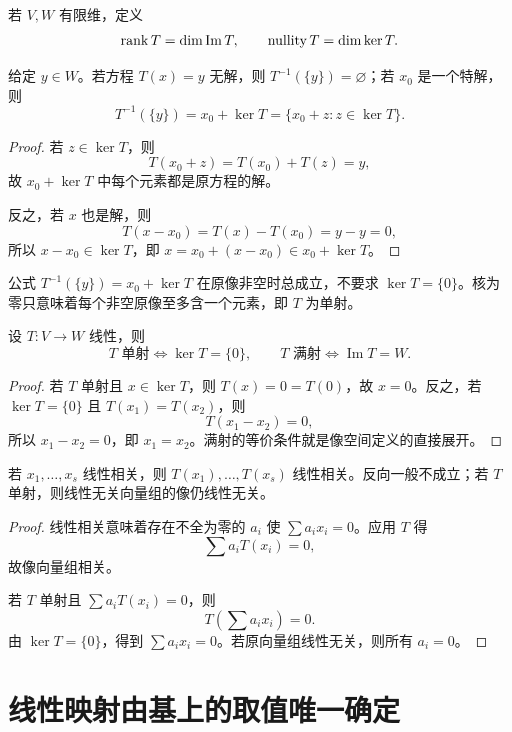 \begin{definition}[秩与零化度]
若 $V,W$ 有限维，定义
\[
\operatorname{rank} T=\dim\operatorname{Im}T,
\qquad
\operatorname{nullity}T=\dim\ker T.
\]
\end{definition}

\begin{theorem}[非空原像是核的仿射陪集]
给定 $y\in W$。若方程 $T(x)=y$ 无解，则 $T^{-1}(\{y\})=\varnothing$；若 $x_0$ 是一个特解，则
\[
T^{-1}(\{y\})=x_0+\ker T
=\{x_0+z:z\in\ker T\}.
\]
\end{theorem}
\begin{proof}
若 $z\in\ker T$，则
\[
T(x_0+z)=T(x_0)+T(z)=y,
\]
故 $x_0+\ker T$ 中每个元素都是原方程的解。

反之，若 $x$ 也是解，则
\[
T(x-x_0)=T(x)-T(x_0)=y-y=0,
\]
所以 $x-x_0\in\ker T$，即 $x=x_0+(x-x_0)\in x_0+\ker T$。
\end{proof}

\begin{pitfall}[原像陪集与单射条件]
公式 $T^{-1}(\{y\})=x_0+\ker T$ 在原像非空时总成立，不要求 $\ker T=\{0\}$。核为零只意味着每个非空原像至多含一个元素，即 $T$ 为单射。
\end{pitfall}

\begin{theorem}[单射、满射与核像]
设 $T:V\to W$ 线性，则
\[
T\text{ 单射}\iff\ker T=\{0\},
\qquad
T\text{ 满射}\iff\operatorname{Im}T=W.
\]
\end{theorem}
\begin{proof}
若 $T$ 单射且 $x\in\ker T$，则 $T(x)=0=T(0)$，故 $x=0$。反之，若 $\ker T=\{0\}$ 且 $T(x_1)=T(x_2)$，则
\[
T(x_1-x_2)=0,
\]
所以 $x_1-x_2=0$，即 $x_1=x_2$。满射的等价条件就是像空间定义的直接展开。
\end{proof}

\begin{proposition}[线性相关性在映射下的变化]
若 $x_1,\ldots,x_s$ 线性相关，则 $T(x_1),\ldots,T(x_s)$ 线性相关。反向一般不成立；若 $T$ 单射，则线性无关向量组的像仍线性无关。
\end{proposition}
\begin{proof}
线性相关意味着存在不全为零的 $a_i$ 使 $\sum a_ix_i=0$。应用 $T$ 得
\[
\sum a_iT(x_i)=0,
\]
故像向量组相关。

若 $T$ 单射且 $\sum a_iT(x_i)=0$，则
\[
T\left(\sum a_ix_i\right)=0.
\]
由 $\ker T=\{0\}$，得到 $\sum a_ix_i=0$。若原向量组线性无关，则所有 $a_i=0$。
\end{proof}

\section{线性映射由基上的取值唯一确定}

